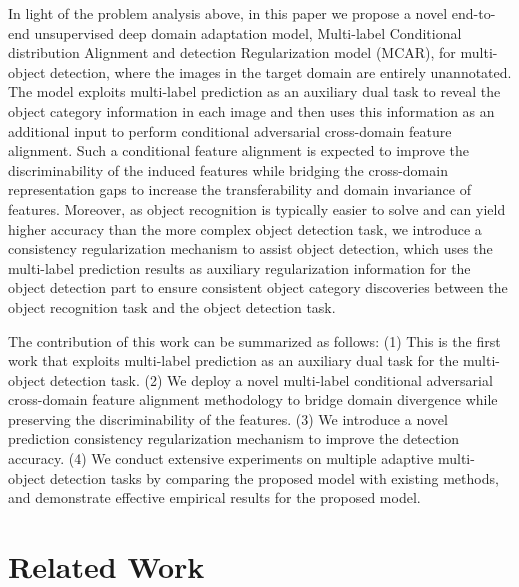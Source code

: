 \documentclass[runningheads]{llncs}
\begin{document}
In light of the problem analysis above, 
in this paper we propose a novel end-to-end unsupervised deep domain adaptation model, 
Multi-label Conditional distribution Alignment and detection Regularization model (MCAR),
for multi-object detection,
where the images in the target domain are entirely unannotated.
The model exploits multi-label prediction as an auxiliary dual task 
to reveal the object category information in each image
and then uses this information as an additional input to perform conditional adversarial cross-domain feature alignment.
Such a conditional feature alignment is expected to improve the discriminability of the induced features
while bridging the cross-domain representation gaps to increase the transferability and domain invariance of features. 
Moreover, as object recognition is typically easier to solve and can yield higher accuracy 
than the more complex object detection task,
we introduce a consistency regularization mechanism to assist object detection, 
which uses the multi-label prediction results as auxiliary regularization information
for the object detection part to ensure consistent object category discoveries between 
the object recognition task and the object detection task.



The contribution of this work can be summarized as follows: 
(1) This is the first work that exploits multi-label prediction as an auxiliary dual task
for the multi-object detection task.
(2) We deploy a novel multi-label conditional adversarial cross-domain feature alignment methodology
to bridge domain divergence while preserving the discriminability of the features.
(3) We introduce a novel prediction consistency regularization mechanism to improve the detection accuracy.
(4) We conduct extensive experiments on multiple adaptive multi-object detection tasks 
by comparing the proposed model
with existing methods, and demonstrate effective empirical results for the proposed model.



\section{Related Work}
\end{document}
